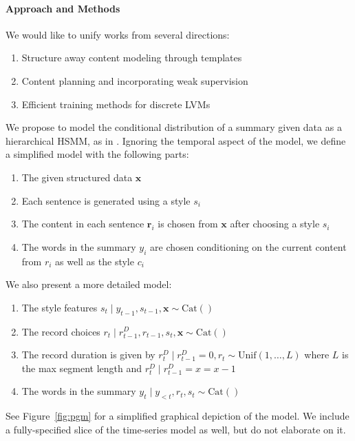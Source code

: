 \documentclass[11pt]{article}
\newcommand{\Cat}{\mathrm{Cat}}
\newcommand\Unif{\mathrm{Unif}}
\newcommand{\br}{\mathbf{r}}
\newcommand{\bx}{\mathbf{x}}
\begin{document}
\paragraph{Approach and Methods}
We would like to unify works from several directions:
\begin{enumerate}
\item Structure away content modeling through templates
\citep{sauper2009wiki,wiseman2018template}
\item Content planning and incorporating weak supervision
\citep{puduppully2018contentselection}
\item Efficient training methods for discrete LVMs \citep{deng2018vattn}
\end{enumerate}
We propose to model the conditional distribution of a summary given data as a 
hierarchical HSMM, as in \citep{liang2009semalign}.
Ignoring the temporal aspect of the model, we define a simplified model
with the following parts:
\begin{enumerate}
\item The given structured data $\bx$ 
\item Each sentence is generated using a style $s_i$
\item The content in each sentence $\br_i$ is chosen from $\bx$
after choosing a style $s_i$
\item The words in the summary $y_i$ are chosen conditioning on
the current content from $r_i$ as well as the style $c_i$
\end{enumerate}
We also present a more detailed model:
\begin{enumerate}
\item The style features $s_t\mid y_{t-1},s_{t-1},\bx\sim\Cat()$
\item The record choices $r_t\mid r_{t-1}^D,r_{t-1},s_t,\bx\sim\Cat()$
\item The record duration is given by 
$r_t^D\mid r_{t-1}^D=0,r_t\sim\Unif(1,\ldots,L)$
where $L$ is the max segment length and $r_t^D\mid r_{t-1}^D=x = x-1$

\item The words in the summary $y_t\mid y_{<t},r_t,s_t\sim\Cat()$
\end{enumerate}
See Figure~\ref{fig:pgm} for a simplified graphical depiction of the model.
We include a fully-specified slice of the time-series model as well,
but do not elaborate on it.
\end{document}

